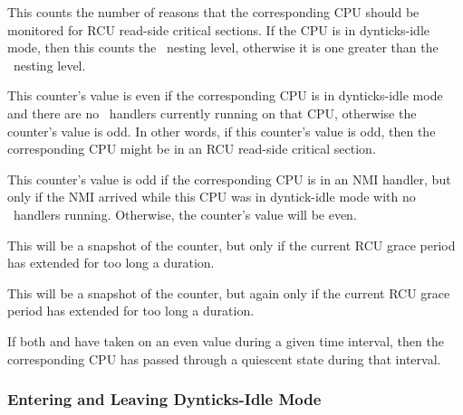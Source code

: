 \begin{description}[style=nextline]
\item	[\tco{dynticks_nesting}]
	This counts the number of reasons that the corresponding
	CPU should be monitored for RCU read-side critical sections.
	If the CPU is in dynticks-idle mode, then this counts the
	\IRQ\ nesting level, otherwise it is one greater than the
	\IRQ\ nesting level.
\item	[\tco{dynticks}]
	This counter's value is even if the corresponding CPU is
	in dynticks-idle mode and there are no \IRQ\ handlers currently
	running on that CPU, otherwise the counter's value is odd.
	In other words, if this counter's value is odd, then the
	corresponding CPU might be in an RCU read-side critical section.
\item	[\tco{dynticks_nmi}]
	This counter's value is odd if the corresponding CPU is
	in an NMI handler, but only if the NMI arrived while this
	CPU was in dyntick-idle mode with no \IRQ\ handlers running.
	Otherwise, the counter's value will be even.
\item	[\tco{dynticks_snap}]
	This will be a snapshot of the  counter, but
	only if the current RCU grace period has extended for too
	long a duration.
\item	[\tco{dynticks_nmi_snap}]
	This will be a snapshot of the  counter, but
	again only if the current RCU grace period has extended for too
	long a duration.
\end{description}

If both  and  have taken on an even
value during a given time interval, then the corresponding CPU has
passed through a quiescent state during that interval.

\QuickQuizEnd

\subsubsection{Entering and Leaving Dynticks-Idle Mode}
\label{sec:formal:Entering and Leaving Dynticks-Idle Mode}

